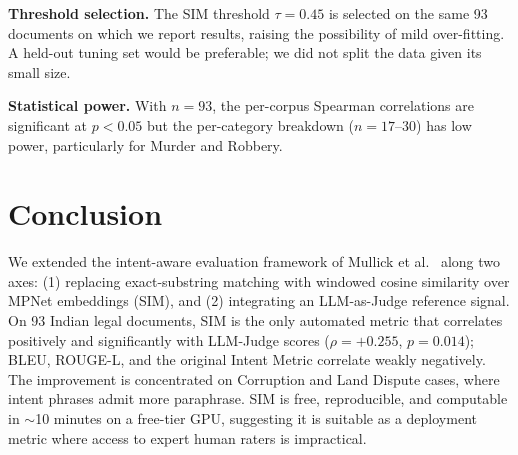 \documentclass[conference,a4paper]{IEEEtran}
\begin{document}
\textbf{Threshold selection.} The SIM threshold $\tau{=}0.45$ is selected on the same 93 documents on which we report results, raising the possibility of mild over-fitting. A held-out tuning set would be preferable; we did not split the data given its small size.

\textbf{Statistical power.} With $n{=}93$, the per-corpus Spearman correlations are significant at $p{<}0.05$ but the per-category breakdown ($n{=}17$--$30$) has low power, particularly for Murder and Robbery.

\section{Conclusion}

We extended the intent-aware evaluation framework of Mullick et al.~\cite{mullick2022} along two axes: (1) replacing exact-substring matching with windowed cosine similarity over MPNet embeddings (SIM), and (2) integrating an LLM-as-Judge reference signal. On 93 Indian legal documents, SIM is the only automated metric that correlates positively and significantly with LLM-Judge scores ($\rho{=}{+}0.255$, $p{=}0.014$); BLEU, ROUGE-L, and the original Intent Metric correlate weakly negatively. The improvement is concentrated on Corruption and Land Dispute cases, where intent phrases admit more paraphrase. SIM is free, reproducible, and computable in $\sim$10 minutes on a free-tier GPU, suggesting it is suitable as a deployment metric where access to expert human raters is impractical.
\end{document}
